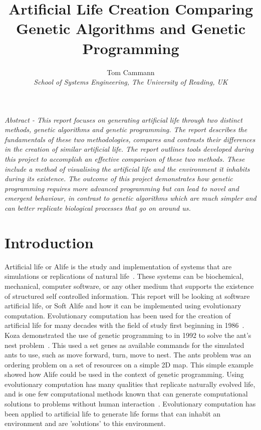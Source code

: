 \documentclass[12pt]{article}
\begin{document}
\title{\LARGE \bf Artificial Life Creation Comparing Genetic Algorithms and Genetic Programming\vspace{1cm}}
\author{\small Tom Cammann\\
\small \it{School of Systems Engineering, The University of Reading, UK}}
\date{}
\maketitle

\renewcommand{\abstractname}{}
\begin{onecolabstract}
\noindent \it Abstract - This report focuses on generating artificial life through two distinct methods, genetic algorithms and genetic programming. The
report describes the fundamentals of these two methodologies, compares and contrasts their differences in the creation of similar 
artificial life. The report outlines tools developed during this project to accomplish an effective comparison of these two methods.
These include a method of visualising the artificial life and the environment it inhabits during its existence. The outcome of 
this project demonstrates how genetic programming requires more advanced programming but can lead to novel and emergent behaviour,
in contrast to genetic algorithms which are much simpler and can better replicate biological processes that go on around us. 
\end{onecolabstract}


\section{Introduction}

Artificial life or Alife is the study and implementation of systems that are simulations or replications of natural life~\cite{adami98}.
These systems can be biochemical, mechanical, computer software, or any other medium that supports the existence of structured self controlled information.
This report will be looking at software artificial life, or Soft Alife and how it can be implemented using evolutionary computation.
Evolutionary computation has been used for the creation of artificial life for many decades with the field of study first beginning in 1986~\cite{mit99}.
Koza demonstrated the use of genetic programming to  in 1992 to solve the ant's nest problem~\cite[~p.329]{koza92}. This used a set genes as available
commands for the simulated ants to use, such as move forward, turn, move to nest. The ants problem was an ordering problem on a set of resources on a simple
2D map. This simple example showed how Alife could be used in the context of genetic programming.
Using evolutionary computation has many qualities that replicate naturally evolved life, and is one few computational methods known that
can generate computational solutions to problems without human interaction~\cite{koza91}.
Evolutionary computation has been applied to artificial life to generate life forms that can inhabit an environment and are 'solutions' to this environment.
\end{document}
